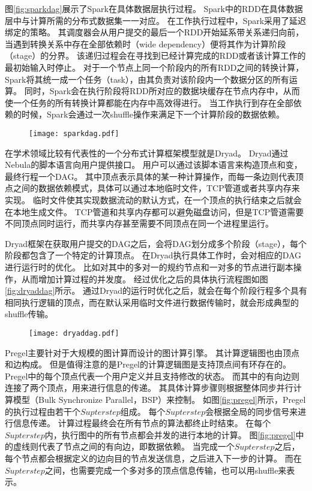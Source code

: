图\ref{fig:sparkdag}展示了Spark在具体数据层执行过程。
Spark中的RDD在具体数据层中与计算所需的分布式数据集一一对应。
在工作执行过程中，Spark采用了延迟绑定的策略。
其调度器会从用户提交的最后一个RDD开始延系带关系递归向前，当遇到转换关系中存在全部依赖时（wide dependency）便将其作为计算阶段（stage）的分界。
该递归过程会在寻找到已经计算完成的RDD或者该计算工作的最初始输入时停止。
对于一个节点上同一个阶段内的所有RDD之间的转换计算，Spark将其统一成一个任务（task），由其负责对该阶段内一个数据分区的所有运算。
同时，Spark会在执行阶段将RDD所对应的数据块缓存在节点内存中，从而使一个任务的所有转换计算都能在内存中高效得进行。
当工作执行到存在全部依赖的时候，Spark会通过一次shuffle操作来满足下一个计算阶段的数据依赖。

\begin{figure}[!htp]
    \centering
    \texttt{[image: sparkdag.pdf]}
\end{figure}

在学术领域比较有代表性的一个分布式计算框架模型就是Dryad\cite{dryad}。
Dryad通过Nebula的脚本语言向用户提供接口。
用户可以通过该脚本语言来构造顶点和变，最终行程一个DAG。
其中顶点表示具体的某一种计算操作，而每一条边则代表顶点之间的数据依赖模式，具体可以通过本地临时文件，TCP管道或者共享内存来实现。
临时文件使其实现数据流动的默认方式，在一个顶点的执行结束之后就会在本地生成文件。
TCP管道和共享内存都可以避免磁盘访问，但是TCP管道需要不同顶点同时运行，而共享内存甚至需要不同顶点在同一个进程里运行。

Dryad框架在获取用户提交的DAG之后，会将DAG划分成多个阶段（stage），每个阶段都包含了一个特定的计算顶点。
在Dryad执行具体工作时，会对相应的DAG进行运行时的优化。
比如对其中的多对一的规约节点和一对多的节点进行副本操作，从而增加计算过程的并发度。
经过优化之后的具体执行流程图如图\ref{fig:dryaddag}所示。
通过Dryad的运行时优化之后，就会在每个阶段行程多个具有相同执行逻辑的顶点，而在默认采用临时文件进行数据传输时，就会形成典型的shuffle传输。

\begin{figure}[!htp]
    \centering
    \texttt{[image: dryaddag.pdf]}
\end{figure}

Pregel\cite{pregel}主要针对于大规模的图计算而设计的图计算引擎。
其计算逻辑图也由顶点和边构成。
但是值得注意的是Pregel的计算逻辑图是支持顶点间有环存在的。
Pregel中的每个顶点代表一个用户定义并且支持修改的状态。
而其中的有向边则连接了两个顶点，用来进行信息的传递。
其具体计算步骤则根据整体同步并行计算模型（Bulk Synchronize Parallel，BSP）来控制。
如图\ref{fig:pregel}所示，Pregel的执行过程由若干个$Supterstep$组成。
每个$Supterstep$会根据全局的同步信号来进行信息传递。
计算过程最终会在所有节点的算法都终止时结束。
在每个$Supterstep$内，执行图中的所有节点都会并发的进行本地的计算。
图\ref{fig:pregel}中的虚线则代表了节点之间的有向边，即数据依赖。
当完成一个$Supterstep$之后，每个节点都会根据定义的边向目的节点发送信息，之后进入下一步的计算。
而在$Supterstep$之间，也需要完成一个多对多的顶点信息传输，也可以用shuffle来表示。

